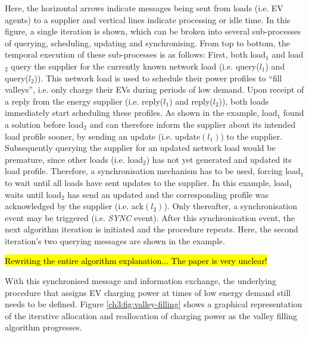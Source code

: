 Here, the horizontal arrows indicate messages being sent from loads (i.e. EV agents) to a supplier and vertical lines indicate processing or idle time.
In this figure, a single iteration is shown, which can be broken into several sub-processes of querying, scheduling, updating and synchronising.
From top to bottom, the temporal execution of these sub-processes is as follows:
First, both load$_1$ and load$_2$ query the supplier for the currently known network load (i.e. query($l_1$) and query($l_2$)).
This network load is used to schedule their power profiles to ``fill valleys'', i.e. only charge their EVs during periods of low demand.
Upon receipt of a  reply from the energy supplier (i.e. reply($l_1$) and reply($l_2$)), both loads immediately start scheduling these profiles.
As shown in the example, load$_1$ found a solution before load$_2$ and can therefore inform the supplier about its intended load profile sooner, by sending an update (i.e. update$(l_1)$) to the supplier.
Subsequently querying the supplier for an updated network load would be premature, since other loads (i.e. load$_2$) has not yet generated and updated its load profile.
Therefore, a synchronisation mechanism has to be used, forcing load$_1$ to wait until all loads have sent updates to the supplier.
In this example, load$_1$ waits until load$_2$ has send an updated and the corresponding profile was acknowledged by the supplier (i.e. ack$(l_2)$).
Only thereafter, a synchronisation event may be triggered (i.e. \textit{SYNC} event).
After this synchronisation event, the next algorithm iteration is initiated and the procedure repeats.
Here, the second iteration's two querying messages are shown in the example.


\hl{Rewriting the entire algorithm explanation... The paper is very unclear!}

With this synchronised message and information exchange, the underlying procedure that assigns EV charging power at times of low energy demand still needs to be defined.
Figure \ref{ch3:fig:valley-filling} shows a graphical representation of the iterative allocation and reallocation of charging power as the valley filling algorithm progresses.

